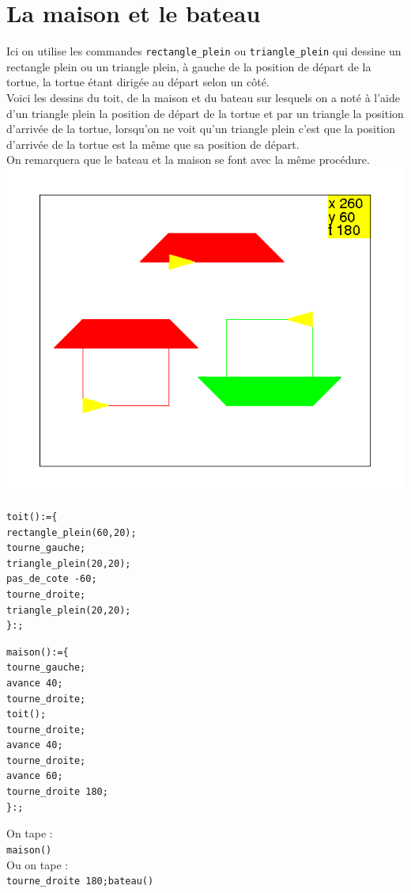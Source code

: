 \documentclass[a4paper,11pt]{book}
\begin{document}
\section{La maison et le bateau}
Ici on utilise les commandes {\tt rectangle\_plein} ou {\tt triangle\_plein} 
qui dessine un rectangle plein ou un triangle plein, 
\`a gauche de la position de d\'epart de la tortue, la tortue \'etant 
dirig\'ee au d\'epart selon un c\^ot\'e.\\
Voici les dessins du toit, de la maison et du bateau sur lesquels on a not\'e 
\`a l'aide d'un triangle plein la position de d\'epart de la tortue et
 par un triangle la position d'arriv\'ee de la tortue, lorsqu'on ne voit qu'un 
triangle plein c'est que la position d'arriv\'ee de la tortue est la m\^eme 
que sa position de d\'epart.\\
On remarquera que le bateau et la maison se font avec la m\^eme proc\'edure.\\
%
\includegraphics[width=\textwidth]{tortbat}
\begin{verbatim}
toit():={
rectangle_plein(60,20);
tourne_gauche;
triangle_plein(20,20);
pas_de_cote -60;
tourne_droite;
triangle_plein(20,20);
}:;
\end{verbatim}
\begin{verbatim}
maison():={
tourne_gauche;
avance 40;
tourne_droite;
toit();
tourne_droite;
avance 40;
tourne_droite;
avance 60;
tourne_droite 180;
}:;
\end{verbatim}
On tape :\\
{\tt maison()}\\
Ou on tape  :\\
{\tt tourne\_droite 180;bateau()}
\end{document}
